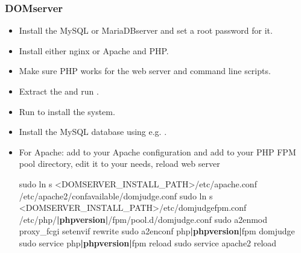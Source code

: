 \documentclass[a4paper,10pt,english,openany]{sphinxmanual}
\begin{document}
\subsubsection{DOMserver}
\label{\detokenize{quick-install:domserver}}\begin{itemize}
\item {} 
\sphinxAtStartPar
Install the MySQL\sphinxhyphen{} or MariaDB\sphinxhyphen{}server and set a root password for it.

\item {} 
\sphinxAtStartPar
Install either nginx or Apache and PHP.

\item {} 
\sphinxAtStartPar
Make sure PHP works for the web server and command line scripts.

\item {} 
\sphinxAtStartPar
Extract the  and run
.

\item {} 
\sphinxAtStartPar
Run  to install the system.

\item {} 
\sphinxAtStartPar
Install the MySQL database using e.g.
.

\item {} 
\sphinxAtStartPar
For Apache: add  to your Apache configuration and
add  to your PHP FPM pool directory, edit
it to your needs, reload web server
\begin{sphinxalltt}
sudo ln \sphinxhyphen{}s \textless{}DOMSERVER\_INSTALL\_PATH\textgreater{}/etc/apache.conf /etc/apache2/conf\sphinxhyphen{}available/domjudge.conf
sudo ln \sphinxhyphen{}s \textless{}DOMSERVER\_INSTALL\_PATH\textgreater{}/etc/domjudge\sphinxhyphen{}fpm.conf /etc/php/{\color{red}\bfseries{}|phpversion|}/fpm/pool.d/domjudge.conf
sudo a2enmod proxy\_fcgi setenvif rewrite
sudo a2enconf php{\color{red}\bfseries{}|phpversion|}\sphinxhyphen{}fpm domjudge
sudo service php{\color{red}\bfseries{}|phpversion|}\sphinxhyphen{}fpm reload
sudo service apache2 reload
\end{sphinxalltt}


\end{itemize}
\end{document}
